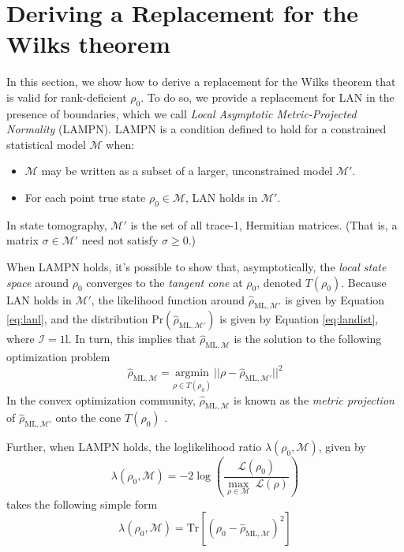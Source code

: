 \documentclass[aps,pra, twocolumn]{revtex4-1}
\newcommand{\M}{\mathcal{M}}
\newcommand{\cL}{\mathcal{L}}
\newcommand{\Id}{\mathbb{I}}
\def\Id{1\!\mathrm{l}}
\newcommand{\rhohat}{\hat{\rho}}
\newcommand{\rhoML}[1]{\rhohat_{\scriptscriptstyle{\mathrm{ML},#1}}}
\begin{document}
\section{Deriving a Replacement for the Wilks theorem}
\label{sec:wilksreplacement}

In this section, we show how to derive a replacement for the Wilks theorem that is valid for rank-deficient $\rho_{0}$. To do so, we provide a replacement for LAN in the presence of boundaries, which we call \emph{Local Asymptotic Metric-Projected Normality} (LAMPN). LAMPN is a condition defined to hold for a constrained statistical model $\M$ when:

\begin{itemize}
\item $\M$ may be written as a subset of a larger, unconstrained model $\M'$.
\item For each point true state $\rho_{0} \in \M$, LAN holds in $\M'$.
\end{itemize}

In state tomography, $\M'$ is the set of all trace-1, Hermitian matrices. (That is, a matrix $\sigma \in \M'$ need not satisfy $\sigma \geq 0$.)

When LAMPN holds, it's possible to show that, asymptotically, the \emph{local state space} around $\rho_{0}$ converges to the \emph{tangent cone} at $\rho_{0}$, denoted $T(\rho_{0})$. Because LAN holds in $\M'$, the likelihood function around $\rhoML{\M'}$ is given by Equation \eqref{eq:lanl}, and the distribution $\mathrm{Pr}(\rhoML{\M'})$ is given by Equation \eqref{eq:landist}, where $\mathcal{I} = \Id$. In turn, this implies that $\rhoML{\M}$ is the solution to the following optimization problem
\begin{equation}
\label{eq:lampnmle}
\rhoML{\M} = \underset{\rho \in T(\rho_{0})}{\text{argmin}}~||\rho  -\rhoML{\M'}||^{2}
\end{equation}
In the convex optimization community, $\rhoML{\M}$ is known as the \emph{metric projection} of $\rhoML{\M'}$ onto the cone $T(\rho_{0})$ \cite{McCoy2014}. 

Further, when LAMPN holds, the loglikelihood ratio $\lambda(\rho_{0}, \M)$, given by
\[\lambda(\rho_{0}, \M) = -2 \log \left(\frac{\cL(\rho_{0})}{\underset{\rho \in \M}{\max}~\cL(\rho)}\right)\]
takes the following simple form
\[\lambda(\rho_{0}, \M) = \mathrm{Tr}[(\rho_{0} - \rhoML{\M})^{2}]\]
\end{document}
